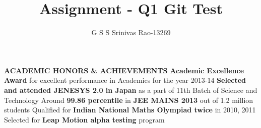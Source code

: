\documentclass[9pt]{article}
\title{Assignment - Q1 Git Test}
\author{G S S Srinivas Rao-13269}
\date{}
\begin{document}
\maketitle

\vspace{0.5cm}
\raggedright
\textbf{\large{ACADEMIC HONORS \& ACHIEVEMENTS}}\vspace{0.1cm}
\newline
\textbf{Academic Excellence Award} for excellent performance in Academics for the year 2013-14
\newline
\textbf{Selected and attended JENESYS 2.0 in Japan} as a part of 11th Batch of Science and Technology
\newline
Around \textbf{99.86 percentile} in \textbf{JEE MAINS 2013} out of 1.2 million students
\newline
Qualified for \textbf{Indian National Maths Olympiad twice} in 2010, 2011
\newline
Selected for \textbf{Leap Motion alpha testing} program
\end{document}
